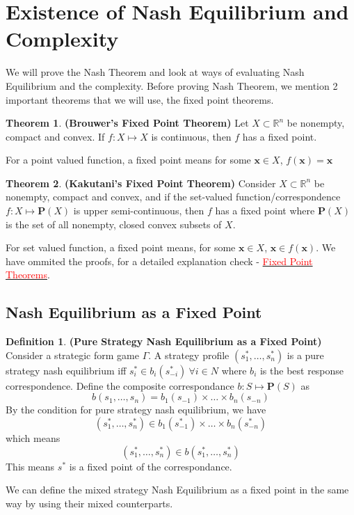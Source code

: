 \documentclass{article}
\theoremstyle{definition}
\newtheorem{theorem}{Theorem}[section]
\newtheorem{defn}{Definition}[section]
\begin{document}
\section{Existence of Nash Equilibrium and Complexity}
We will prove the Nash Theorem and look at ways of evaluating Nash Equilibrium and the complexity. Before proving Nash Theorem, we mention 2 important theorems that we will use, the fixed point theorems.
\begin{theorem}
\textbf{(Brouwer's Fixed Point Theorem)} Let $X\subset \mathbb{R}^n$ be nonempty, compact and convex. If $f:X\mapsto X$ is continuous, then $f$ has a fixed point.
\end{theorem}
For a point valued function, a fixed point means for some $\mathbf{x}\in X$, $f(\mathbf{x}) = \mathbf{x}$
\begin{theorem}
\label{Kakutani}
\textbf{(Kakutani's Fixed Point Theorem)} Consider $X\subset \mathbb{R}^n$ be nonempty, compact and convex, and if the set-valued function/correspondence $f:X\mapsto\mathbf{P}(X)$ is upper semi-continuous, then $f$ has a fixed point where $\mathbf{P}(X)$ is the set of all nonempty, closed convex subsets of $X$. 
\end{theorem}
For set valued function, a fixed point means, for some $\mathbf{x} \in X$, $\mathbf{x}\in f(\mathbf{x})$. We have ommited the proofs, for a detailed explanation check - \href{Fixed_Point_Theorems.pdf}{\textcolor{red}{Fixed Point Theorems}}.
\subsection{Nash Equilibrium as a Fixed Point}
\begin{defn}
\textbf{(Pure Strategy Nash Equilibrium as a Fixed Point)} Consider a strategic form game $\Gamma$. A strategy profile $(s_1^*,\dots,s_n^*)$ is a pure strategy nash equilibrium iff $s_i^* \in b_i(s_{-i}^*)~\forall i\in N$ where $b_i$ is the best response correspondence. Define the composite correspondance $b:S\mapsto\mathbf{P}(S)$ as $$b(s_1,\dots,s_n) = b_1(s_{-1})\times \dots \times b_n(s_{-n})$$ By the condition for pure strategy nash equilibrium, we have $$(s_1^*,\dots, s_n^*)\in b_1(s_{-1}^*)\times\dots\times b_n(s_{-n}^*)$$ which means $$(s_1^*,\dots, s_n^*)  \in b(s_1^*,\dots, s_n^*)$$ This means $s^*$ is a fixed point of the correspondance.
\end{defn}
We can define the mixed strategy Nash Equilibrium as a fixed point in the same way by using their mixed counterparts.
\end{document}
